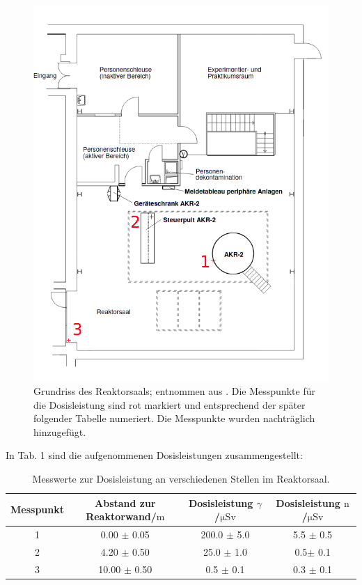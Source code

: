 \documentclass[german,  %
parskip=full,  %
]{scrartcl}
\begin{document}
\begin{figure}[h!]\centering
\includegraphics[width=\textwidth]{Grundriss.png}
\caption{Grundriss des Reaktorsaals; entnommen aus \cite{4}. Die Messpunkte für die Dosisleistung sind rot markiert und entsprechend der später folgender Tabelle numeriert. Die Messpunkte wurden nachträglich hinzugefügt.}
\end{figure} 


\newpage
In Tab. 1 sind die aufgenommenen Dosisleistungen zusammengestellt:


\begin{table}[h!]\centering
\begin{tabular}{|c|c|c|c|}
\hline
Messpunkt & Abstand zur Reaktorwand/\(\mathrm{m}\) & Dosisleistung \(\gamma\)/\(\mathrm{\mu Sv}\) & Dosisleistung \(\mathrm{n}\)/\(\mathrm{\mu Sv}\) \\\hline
1 & 0.00 \(\pm\) 0.05 & 200.0 \(\pm\) 5.0 & 5.5 \(\pm\) 0.5\\\hline
2 & 4.20 \(\pm\) 0.50 & 25.0 \(\pm\) 1.0 & 0.5\(\pm\) 0.1\\\hline
3 & 10.00 \(\pm\) 0.50 & 0.5 \(\pm\) 0.1 & 0.3 \(\pm\) 0.1 \\\hline
\end{tabular}
\caption{Messwerte zur Dosisleistung an verschiedenen Stellen im Reaktorsaal.}
\end{table}
\end{document}
